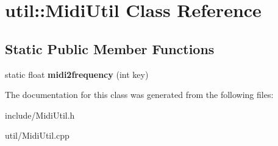 \hypertarget{classutil_1_1MidiUtil}{}\section{util\+:\+:Midi\+Util Class Reference}
\label{classutil_1_1MidiUtil}
\subsection*{Static Public Member Functions}
\begin{DoxyCompactItemize}
\item 
static float {\bfseries midi2frequency} (int key)\hypertarget{classutil_1_1MidiUtil_a04b46794718bd5d4eeaa58b110bea689}{}\label{classutil_1_1MidiUtil_a04b46794718bd5d4eeaa58b110bea689}

\end{DoxyCompactItemize}


The documentation for this class was generated from the following files\+:\begin{DoxyCompactItemize}
\item 
include/Midi\+Util.\+h\item 
util/Midi\+Util.\+cpp\end{DoxyCompactItemize}
